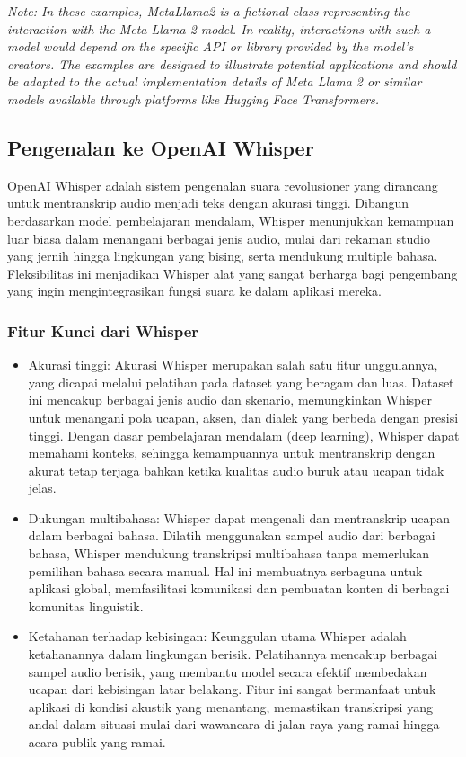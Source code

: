 \documentclass{article}
\begin{document}
\textit{Note: In these examples, MetaLlama2 is a fictional class representing the interaction with the Meta Llama 2 model. In reality, interactions with such a model would depend on the specific API or library provided by the model's creators. The examples are designed to illustrate potential applications and should be adapted to the actual implementation details of Meta Llama 2 or similar models available through platforms like Hugging Face Transformers.}

\subsection{Pengenalan ke OpenAI Whisper}
OpenAI Whisper adalah sistem pengenalan suara revolusioner yang dirancang untuk mentranskrip audio menjadi teks dengan akurasi tinggi. Dibangun berdasarkan model pembelajaran mendalam, Whisper menunjukkan kemampuan luar biasa dalam menangani berbagai jenis audio, mulai dari rekaman studio yang jernih hingga lingkungan yang bising, serta mendukung multiple bahasa. Fleksibilitas ini menjadikan Whisper alat yang sangat berharga bagi pengembang yang ingin mengintegrasikan fungsi suara ke dalam aplikasi mereka.

\subsubsection{Fitur Kunci dari Whisper}
\begin{itemize}
    \item Akurasi tinggi: Akurasi Whisper merupakan salah satu fitur unggulannya, yang dicapai melalui pelatihan pada dataset yang beragam dan luas. Dataset ini mencakup berbagai jenis audio dan skenario, memungkinkan Whisper untuk menangani pola ucapan, aksen, dan dialek yang berbeda dengan presisi tinggi. Dengan dasar pembelajaran mendalam (deep learning), Whisper dapat memahami konteks, sehingga kemampuannya untuk mentranskrip dengan akurat tetap terjaga bahkan ketika kualitas audio buruk atau ucapan tidak jelas.
    \item Dukungan multibahasa: Whisper dapat mengenali dan mentranskrip ucapan dalam berbagai bahasa. Dilatih menggunakan sampel audio dari berbagai bahasa, Whisper mendukung transkripsi multibahasa tanpa memerlukan pemilihan bahasa secara manual. Hal ini membuatnya serbaguna untuk aplikasi global, memfasilitasi komunikasi dan pembuatan konten di berbagai komunitas linguistik.
    \item Ketahanan terhadap kebisingan: Keunggulan utama Whisper adalah ketahanannya dalam lingkungan berisik. Pelatihannya mencakup berbagai sampel audio berisik, yang membantu model secara efektif membedakan ucapan dari kebisingan latar belakang. Fitur ini sangat bermanfaat untuk aplikasi di kondisi akustik yang menantang, memastikan transkripsi yang andal dalam situasi mulai dari wawancara di jalan raya yang ramai hingga acara publik yang ramai.
\end{itemize}
\end{document}
